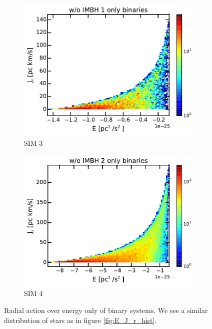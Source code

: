 \begin{figure}[htbp]
\begin{subfigure}{0.475\textwidth}
		\includegraphics[width=\textwidth]{Plots/E_J_r_hist_bins_noIMBH1.pdf}
		\caption{SIM 3}
		\label{fig:E_J_r_hist_bins_noIMBH1}
	\end{subfigure}
	\hfill
	\begin{subfigure}{0.475\textwidth}
		\includegraphics[width=\textwidth]{Plots/E_J_r_hist_bins_noIMBH2.pdf}
		\caption{SIM 4}
		\label{fig:E_J_r_hist_bins_noIMBH2}
	\end{subfigure}
	\caption{Radial action over energy only of binary systems. We see a similar distribution of stars as in figure \ref{fig:E_J_r_hist}.}
	\label{fig:E_J_r_bins_hist}
\end{figure}

